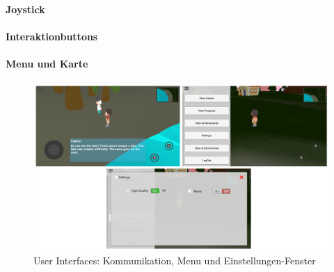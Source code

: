 			\paragraph{Joystick}
			
			\paragraph{Interaktionbuttons}
			
			\paragraph{Menu und Karte}
			
				\begin{figure}[htbp]
					\centering 
					\label{userInterfaces}
					\includegraphics[width=\textwidth]{pics/userInterface.png}
					\caption{User Interfaces: Kommunikation, Menu und Einstellungen-Fenster}
				\end{figure}
		
